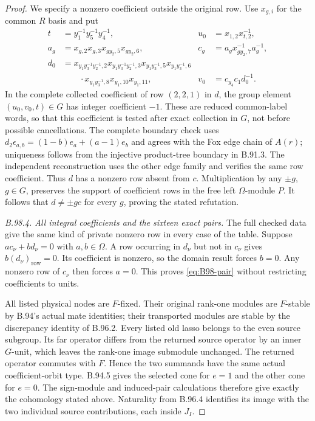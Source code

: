 \begin{proof}
We specify a nonzero coefficient outside the original row.
Use $x_{g,i}$ for the common $R$ basis and put
\begin{align*}
 t&=y_1^{-1}y_5^{-1}y_4^{-1},&
 u_0&=x_{1,2}x_{t,2}^{-1},\\
 a_g&=x_{g,2}x_{g,3}x_{gy_2,5}x_{gy_2,6},&
 c_g&=a_gx_{gy_2,7}^{-1}a_g^{-1},\\
 d_0&=x_{y_1y_3^{-1}y_2^{-1},2}
       x_{y_1y_3^{-1}y_2^{-1},3}
       x_{y_1y_3^{-1},5}x_{y_1y_3^{-1},6}\\
    &\qquad\cdot x_{y_1y_3^{-1},8}x_{y_1,10}x_{y_1,11},&
 v_0&=c_{y_4}c_1d_0^{-1}.
\end{align*}
In the complete collected coefficient of row $(2,2,1)$ in $d$,
the group element $(u_0,v_0,t)\in G$ has integer coefficient
$-1$.  These are reduced common-label words, so that this
coefficient is tested after exact collection in $G$, not before
possible cancellations.  The complete boundary check uses
$d_2\epsilon_{a,b}=(1-b)e_a+(a-1)e_b$ and agrees with the
Fox edge chain of $A(r)$; uniqueness follows from the injective
product-tree boundary in B.91.3.  The independent reconstruction
uses the other edge family and verifies the same row coefficient.
Thus $d$ has a nonzero row absent from $c$.  Multiplication by
any $\pm g$, $g\in G$, preserves the support of coefficient
rows in the free left $\Omega$-module $P$.  It follows that
$d\ne\pm gc$ for every $g$, proving the stated refutation.

\emph{B.98.4. All integral coefficients and the sixteen exact pairs.}
The full checked data give the same kind of private nonzero
row in every case of the table.  Suppose $a c_\nu+b d_\nu=0$
with $a,b\in\Omega$.  A row occurring in $d_\nu$ but not in
$c_\nu$ gives $b(d_\nu)_{\mathrm{row}}=0$.  Its coefficient
is nonzero, so the domain result forces $b=0$.  Any nonzero
row of $c_\nu$ then forces $a=0$.  This proves
\eqref{eq:B98-pair} without restricting coefficients to units.

All listed physical nodes are $F$-fixed.  Their original
rank-one modules are $F$-stable by B.94's actual mate identities;
their transported modules are stable by the discrepancy identity
of B.96.2.  Every listed old lasso belongs to the even source
subgroup.  Its far operator differs from the returned source
operator by an inner $G$-unit, which leaves the rank-one image
submodule unchanged.  The returned operator commutes with $F$.
Hence the two summands have the same actual coefficient-orbit
type.  B.94.5 gives the selected cone for $e=1$ and the other
cone for $e=0$.  The sign-module and induced-pair calculations
therefore give exactly the cohomology stated above.  Naturality
from B.96.4 identifies its image with the two individual source
contributions, each inside $J_I$.


\end{proof}
